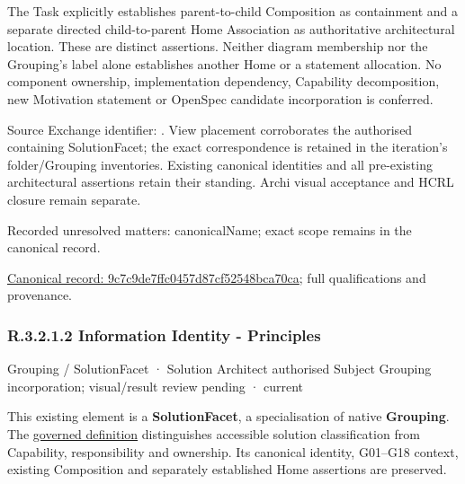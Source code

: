 The Task explicitly establishes parent-to-child Composition as containment and
a separate directed child-to-parent Home Association as authoritative architectural
location. These are distinct assertions. Neither diagram membership nor the
Grouping's label alone establishes another Home or a statement allocation.
No component ownership, implementation dependency, Capability decomposition,
new Motivation statement or OpenSpec candidate incorporation is conferred.



Source Exchange identifier: \texttt{}. View placement corroborates
the authorised containing SolutionFacet; the exact correspondence is retained in the
iteration's folder/Grouping inventories. Existing canonical identities and all
pre-existing architectural assertions retain their standing. Archi visual
acceptance and HCRL closure remain separate.


{\small Recorded unresolved matters: canonicalName; exact scope remains in the canonical record.}\par
{\footnotesize \href{../../../../../../../continuum/grouping/9c7c9de7ffc0457d87cf52548bca70ca.md}{Canonical record: 9c7c9de7ffc0457d87cf52548bca70ca}; full qualifications and provenance.}\par
\subsubsection*{R.3.2.1.2 Information Identity - Principles}
\label{navigation:R.3.2.1.2}

\label{element:d931781bb22243fdb892937b88141cf4}
{\small Grouping / SolutionFacet · Solution Architect authorised Subject Grouping incorporation; visual/result review pending · current}\par

This existing element is a \textbf{SolutionFacet}, a specialisation of native
\textbf{Grouping}. The \href{\detokenize{../../../../../../../governance/continuum-representation.md#solutionfacet-classification--1119-candidate}}{governed definition}
distinguishes accessible solution classification from Capability, responsibility
and ownership. Its canonical identity, G01–G18 context, existing Composition
and separately established Home assertions are preserved.



